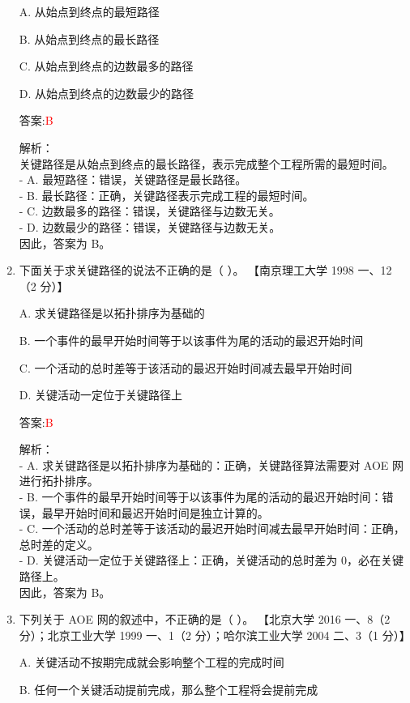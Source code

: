 \documentclass[lang=cn,newtx,10pt,scheme=chinese]{../../../elegantbook}
\begin{document}
\begin{enumerate}
    A. 从始点到终点的最短路径  

    B. 从始点到终点的最长路径  

    C. 从始点到终点的边数最多的路径  

    D. 从始点到终点的边数最少的路径  

    答案:\textcolor{red}{B}

    解析：\\
    关键路径是从始点到终点的最长路径，表示完成整个工程所需的最短时间。\\
    - A. 最短路径：错误，关键路径是最长路径。\\
    - B. 最长路径：正确，关键路径表示完成工程的最短时间。\\
    - C. 边数最多的路径：错误，关键路径与边数无关。\\
    - D. 边数最少的路径：错误，关键路径与边数无关。\\
    因此，答案为 B。

\item 下面关于求关键路径的说法不正确的是（ ）。  
    【南京理工大学 1998 一、12（2 分）】  

    A. 求关键路径是以拓扑排序为基础的  

    B. 一个事件的最早开始时间等于以该事件为尾的活动的最迟开始时间  

    C. 一个活动的总时差等于该活动的最迟开始时间减去最早开始时间  

    D. 关键活动一定位于关键路径上  

    答案:\textcolor{red}{B}

    解析：\\
    - A. 求关键路径是以拓扑排序为基础的：正确，关键路径算法需要对 AOE 网进行拓扑排序。\\
    - B. 一个事件的最早开始时间等于以该事件为尾的活动的最迟开始时间：错误，最早开始时间和最迟开始时间是独立计算的。\\
    - C. 一个活动的总时差等于该活动的最迟开始时间减去最早开始时间：正确，总时差的定义。\\
    - D. 关键活动一定位于关键路径上：正确，关键活动的总时差为 0，必在关键路径上。\\
    因此，答案为 B。

\item 下列关于 AOE 网的叙述中，不正确的是（ ）。  
    【北京大学 2016 一、8（2 分）；北京工业大学 1999 一、1（2 分）；哈尔滨工业大学 2004 二、3（1 分）】  

    A. 关键活动不按期完成就会影响整个工程的完成时间  

    B. 任何一个关键活动提前完成，那么整个工程将会提前完成  


\end{enumerate}
\end{document}
